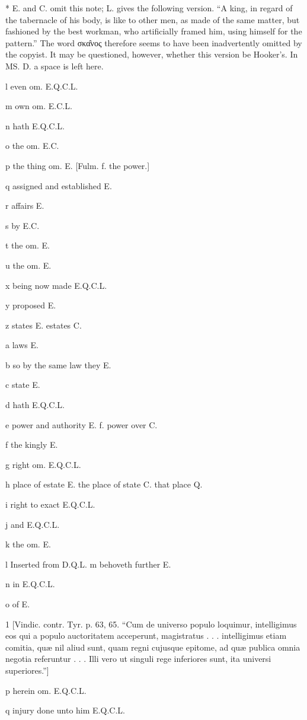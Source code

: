 *
E. and C. omit this note; L. gives the following version. “A king, in regard of the tabernacle of his body, is like to other men, as made of the same matter, but fashioned by the best workman, who artificially framed him, using himself for the pattern.” The word σκα̑νος therefore seems to have been inadvertently omitted by the copyist. It may be questioned, however, whether this version be Hooker’s. In MS. D. a space is left here.

l
even om. E.Q.C.L.

m
own om. E.C.L.

n
hath E.Q.C.L.

o
the om. E.C.

p
the thing om. E. [Fulm. f. the power.]

q
assigned and established E.

r
affairs E.

s
by E.C.

t
the om. E.

u
the om. E.

x
being now made E.Q.C.L.

y
proposed E.

z
states E. estates C.

a
laws E.

b
so by the same law they E.

c
state E.

d
hath E.Q.C.L.

e
power and authority E. f. power over C.

f
the kingly E.

g
right om. E.Q.C.L.

h
place of estate E. the place of state C. that place Q.

i
right to exact E.Q.C.L.

j
and E.Q.C.L.

k
the om. E.

l Inserted from D.Q.L.
m
behoveth further E.

n
in E.Q.C.L.

o
of E.

1
[Vindic. contr. Tyr. p. 63, 65. “Cum de universo populo loquimur, intelligimus eos qui a populo auctoritatem acceperunt, magistratus . . . intelligimus etiam comitia, quæ nil aliud sunt, quam regni cujusque epitome, ad quæ publica omnia negotia referuntur . . . Illi vero ut singuli rege inferiores sunt, ita universi superiores.”]

p
herein om. E.Q.C.L.

q
injury done unto him E.Q.C.L.

